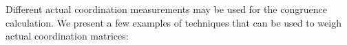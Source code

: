 \documentclass[times, 10pt,twocolumn]{article}
\begin{document}


Different actual coordination measurements may be used for the congruence calculation. We present a few examples of techniques that can be used to weigh actual coordination matrices:









\end{document}
